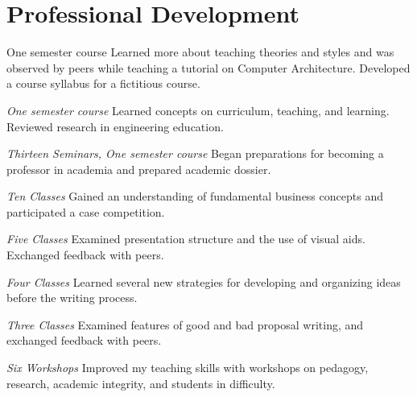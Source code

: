 \section{\sc Professional Development}

{One semester course}{ }
{
  Learned more about teaching theories and styles and was observed by peers while teaching a tutorial on Computer Architecture.
  Developed a course syllabus for a fictitious course.
}

{\em One semester course}{ }
{
  Learned concepts on curriculum, teaching, and learning. Reviewed research in engineering education.
}

{\em Thirteen Seminars, One semester course}{ }
{
  Began preparations for becoming a professor in academia and prepared academic dossier.
}

{\em Ten Classes}{ }
{
  Gained an understanding of fundamental business concepts and participated a case competition.
}

{\em Five Classes}{ }
{
  Examined presentation structure and the use of visual aids.
  Exchanged feedback with peers.
}

{\em Four Classes}{ }
{
  Learned several new strategies for developing and organizing ideas before the writing process.
}

{\em Three Classes}{ }
{
  Examined features of good and bad proposal writing, and exchanged feedback with peers.
}

{\em Six Workshops}{ }
{
  Improved my teaching skills with workshops on pedagogy, research, academic integrity, and students in difficulty.
}
